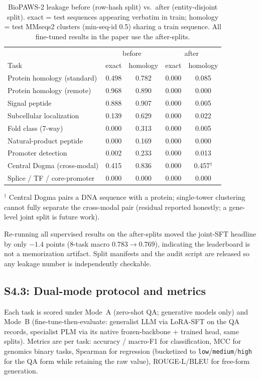 \documentclass[11pt]{article}
\begin{document}
\begin{table}[H]
\centering
\small
\caption{BioPAWS-2 leakage before (row-hash split) vs.\ after (entity-disjoint split).
exact = test sequences appearing verbatim in train; homology = test MMseqs2 clusters
(min-seq-id 0.5) sharing a train sequence. All fine-tuned results in the paper use the
after-splits.}
\label{tab:supp-leak}
\begin{tabular}{lcccc}
\toprule
 & \multicolumn{2}{c}{before} & \multicolumn{2}{c}{after} \\
Task & exact & homology & exact & homology \\
\midrule
Protein homology (standard)  & 0.498 & 0.782 & 0.000 & 0.085 \\
Protein homology (remote)    & 0.968 & 0.890 & 0.000 & 0.000 \\
Signal peptide               & 0.888 & 0.907 & 0.000 & 0.005 \\
Subcellular localization     & 0.139 & 0.629 & 0.000 & 0.022 \\
Fold class (7-way)           & 0.000 & 0.313 & 0.000 & 0.005 \\
Natural-product peptide      & 0.000 & 0.169 & 0.000 & 0.000 \\
Promoter detection           & 0.002 & 0.233 & 0.000 & 0.013 \\
Central Dogma (cross-modal)  & 0.415 & 0.836 & 0.000 & 0.457$^{\dagger}$ \\
Splice / TF / core-promoter  & 0.000 & 0.000 & 0.000 & 0.000 \\
\bottomrule
\end{tabular}

\vspace{2pt}
{\footnotesize $^{\dagger}$ Central Dogma pairs a DNA sequence with a protein; single-tower
clustering cannot fully separate the cross-modal pair (residual reported honestly; a
gene-level joint split is future work).}
\end{table}

Re-running all supervised results on the after-splits moved the joint-SFT headline by only
$-1.4$ points (8-task macro $0.783 \to 0.769$), indicating the leaderboard is not a
memorization artifact. Split manifests and the audit script are released so any leakage
number is independently checkable.

\subsection*{S4.3: Dual-mode protocol and metrics}
Each task is scored under Mode~A (zero-shot QA; generative models only) and Mode~B
(fine-tune-then-evaluate: generalist LLM via LoRA-SFT on the QA records, specialist PLM via
its native frozen-backbone + trained head, same splits). Metrics are per task: accuracy /
macro-F1 for classification, MCC for genomics binary tasks, Spearman for regression
(bucketized to \texttt{low}/\texttt{medium}/\texttt{high} for the QA form while retaining the
raw value), ROUGE-L/BLEU for free-form generation.
\end{document}
